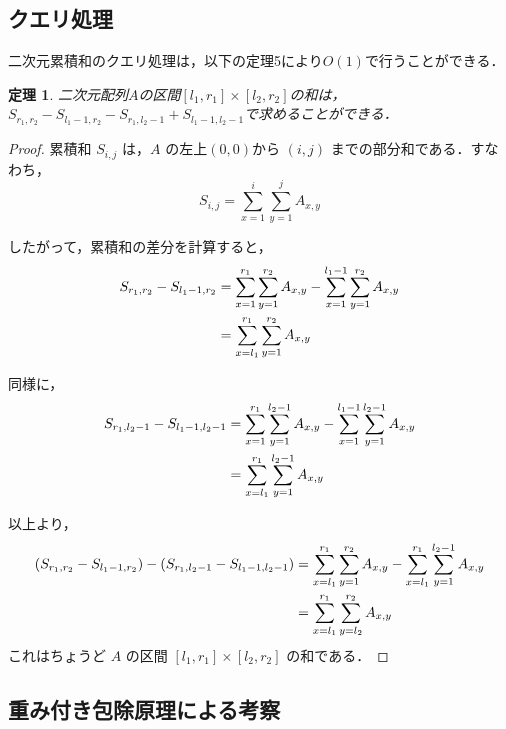 \documentclass[11pt]{jsreport}
\theoremstyle{plain} %
\newtheorem{theorem}{定理}
\theoremstyle{definition}
\begin{document}
\newpage
\subsection{クエリ処理}

二次元累積和のクエリ処理は，以下の定理5により$O(1)$で行うことができる．

\begin{theorem}
    二次元配列$A$の区間$[l_1, r_1] \times [l_2, r_2]$の和は，$S_{r_1, r_2} - S_{l_1-1, r_2} - S_{r_1, l_2-1} + S_{l_1-1, l_2-1}$で求めることができる．
\end{theorem}

\begin{proof}
    累積和 $S_{i,j}$ は，$A$ の左上$(0, 0)$から $(i, j)$ までの部分和である．すなわち，
    \begin{equation}
        S_{i, j} = \sum_{x=1}^{i} \sum_{y=1}^{j} A_{x, y}
    \end{equation}

    したがって，累積和の差分を計算すると，
    \begin{align}
        S_{r_1, r_2} - S_{l_1-1, r_2} &= \sum_{x=1}^{r_1} \sum_{y=1}^{r_2} A_{x, y} - \sum_{x=1}^{l_1-1} \sum_{y=1}^{r_2} A_{x, y} \notag \\
        &= \sum_{x=l_1}^{r_1} \sum_{y=1}^{r_2} A_{x, y}
    \end{align}

    同様に，
    \begin{align}
        S_{r_1, l_2-1} - S_{l_1-1, l_2-1} &= \sum_{x=1}^{r_1} \sum_{y=1}^{l_2-1} A_{x, y} - \sum_{x=1}^{l_1-1} \sum_{y=1}^{l_2-1} A_{x, y} \notag \\
        &= \sum_{x=l_1}^{r_1} \sum_{y=1}^{l_2-1} A_{x, y}
    \end{align}

    以上より，
    \begin{align}
        (S_{r_1, r_2} - S_{l_1-1, r_2}) - (S_{r_1, l_2-1} - S_{l_1-1, l_2-1}) &= \sum_{x=l_1}^{r_1} \sum_{y=1}^{r_2} A_{x, y} - \sum_{x=l_1}^{r_1} \sum_{y=1}^{l_2-1} A_{x, y} \notag \\
        &= \sum_{x=l_1}^{r_1} \sum_{y=l_2}^{r_2} A_{x, y}
    \end{align}
    これはちょうど $A$ の区間 $[l_1, r_1] \times [l_2, r_2]$ の和である．
\end{proof}

\subsection{重み付き包除原理による考察}
\end{document}
